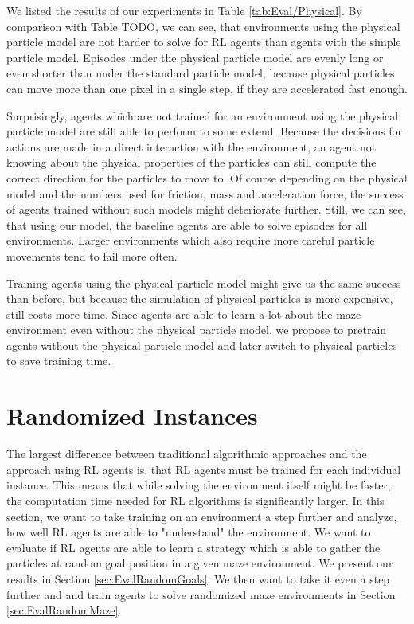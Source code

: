 We listed the results of our experiments in Table \ref{tab:Eval/Physical}. By comparison with Table TODO, we can see, that environments using the physical particle model are not harder to solve for RL agents than agents with the simple particle model. Episodes under the physical particle model are evenly long or even shorter than under the standard particle model, because physical particles can move more than one pixel in a single step, if they are accelerated fast enough. 

Surprisingly, agents which are not trained for an environment using the physical particle model are still able to perform to some extend. Because the decisions for actions are made in a direct interaction with the environment, an agent not knowing about the physical properties of the particles can still compute the correct direction for the particles to move to. Of course depending on the physical model and the numbers used for friction, mass and acceleration force, the success of agents trained without such models might deteriorate further. Still, we can see, that using our model, the baseline agents are able to solve episodes for all environments. Larger environments which also require more careful particle movements tend to fail more often. 

Training agents using the physical particle model might give us the same success than before, but because the simulation of physical particles is more expensive, still costs more time. Since agents are able to learn a lot about the maze environment even without the physical particle model, we propose to pretrain agents without the physical particle model and later switch to physical particles to save training time.  

\section{Randomized Instances} \label{sec:EvalRandomness}
The largest difference between traditional algorithmic approaches and the approach using RL agents is, that RL agents must be trained for each individual instance. This means that while solving the environment itself might be faster, the computation time needed for RL algorithms is significantly larger. In this section, we want to take training on an environment a step further and analyze, how well RL agents are able to "understand" the environment. We want to evaluate if RL agents are able to learn a strategy which is able to gather the particles at random goal position in a given maze environment. We present our results in Section \ref{sec:EvalRandomGoals}. We then want to take it even a step further and and train agents to solve randomized maze environments in Section \ref{sec:EvalRandomMaze}. 


